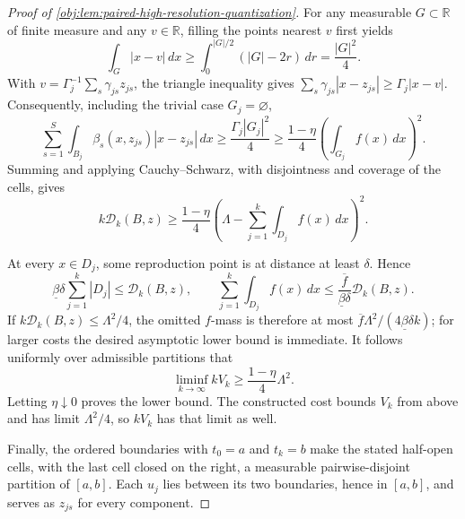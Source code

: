 \begin{proof}[Proof of \cref{obj:lem:paired-high-resolution-quantization}]
For any measurable \(G\subset\mathbb R\) of finite measure and any \(v\in\mathbb R\), filling the points nearest \(v\) first yields
\[
\int_G|x-v|\,dx
\ge\int_0^{|G|/2}(|G|-2r)\,dr
=\frac{|G|^2}{4}.
\]
With \(v=\Gamma_j^{-1}\sum_s\gamma_{js}z_{js}\), the triangle inequality gives
\(\sum_s\gamma_{js}|x-z_{js}|\ge\Gamma_j|x-v|\).
Consequently, including the trivial case \(G_j=\varnothing\),
\[
\sum_{s=1}^S\int_{B_j}\beta_s(x,z_{js})|x-z_{js}|\,dx
\ge\frac{\Gamma_j|G_j|^2}{4}
\ge\frac{1-\eta}{4}\left(\int_{G_j}f(x)\,dx\right)^2.
\]
Summing and applying Cauchy--Schwarz, with disjointness and coverage of the cells, gives
\[
k\mathcal D_k(B,z)
\ge\frac{1-\eta}{4}
\left(\Lambda-\sum_{j=1}^k\int_{D_j}f(x)\,dx\right)^2.
\]

At every \(x\in D_j\), some reproduction point is at distance at least \(\delta\). Hence
\[
\underline\beta\delta\sum_{j=1}^k|D_j|
\le\mathcal D_k(B,z),
\qquad
\sum_{j=1}^k\int_{D_j}f(x)\,dx
\le\frac{\overline f}{\underline\beta\delta}\mathcal D_k(B,z).
\]
If \(k\mathcal D_k(B,z)\le\Lambda^2/4\), the omitted \(f\)-mass is therefore at most
\(\overline f\Lambda^2/(4\underline\beta\delta k)\); for larger costs the desired asymptotic lower bound is immediate. It follows uniformly over admissible partitions that
\[
\liminf_{k\to\infty}kV_k\ge\frac{1-\eta}{4}\Lambda^2.
\]
Letting \(\eta\downarrow0\) proves the lower bound. The constructed cost bounds \(V_k\) from above and has limit \(\Lambda^2/4\), so \(kV_k\) has that limit as well.

Finally, the ordered boundaries with \(t_0=a\) and \(t_k=b\) make the stated half-open cells, with the last cell closed on the right, a measurable pairwise-disjoint partition of \([a,b]\). Each \(u_j\) lies between its two boundaries, hence in \([a,b]\), and serves as \(z_{js}\) for every component.
\end{proof}
